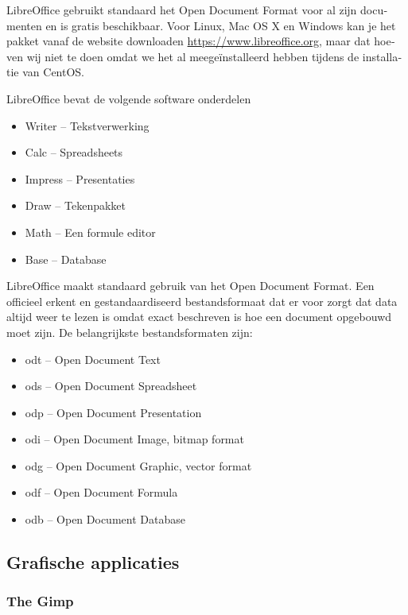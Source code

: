 {
\foreignlanguage{dutch}{LibreOffice gebruikt standaard het Open Document Format voor al zijn documenten en is gratis
beschikbaar. Voor Linux, Mac OS X en Windows kan je het pakket vanaf de website downloaden
}\href{https://www.libreoffice.org/}{https://www.libreoffice.org}\foreignlanguage{dutch}{, maar dat hoeven wij niet te
doen omdat we het al meege\"installeerd hebben tijdens de installatie van CentOS.}}

{
LibreOffice bevat de volgende software onderdelen}

\liststyleLii
\begin{itemize}
\item {
Writer -- Tekstverwerking}
\item {
Calc -- Spreadsheets}
\item {
Impress -- Presentaties}
\item {
Draw -- Tekenpakket}
\item {
Math -- Een formule editor}
\item {
Base -- Database}
\end{itemize}
{
LibreOffice maakt standaard gebruik van het Open Document Format. Een officieel erkent en gestandaardiseerd
bestandsformaat dat er voor zorgt dat data altijd weer te lezen is omdat exact beschreven is hoe een document opgebouwd
moet zijn. De belangrijkste bestandsformaten zijn:}

\liststyleLiii
\begin{itemize}
\item {
odt -- Open Document Text}
\item {
ods -- Open Document Spreadsheet}
\item {
odp -- Open Document Presentation}
\item {
odi -- Open Document Image, bitmap format}
\item {
odg -- Open Document Graphic, vector format}
\item {
odf -- Open Document Formula}
\item {
odb -- Open Document Database}
\end{itemize}
\subsection[Grafische applicaties]{ Grafische applicaties}
\hypertarget{RefHeadingToc21422520829451}{}\subsubsection[The Gimp]{ The Gimp}
\hypertarget{RefHeadingToc24541698778599}{}

